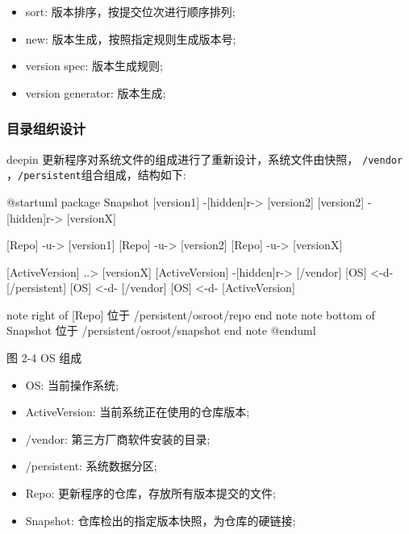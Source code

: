 \documentclass{utart}
\begin{document}
\begin{itemize}[leftmargin=4em]
  \item sort: 版本排序，按提交位次进行顺序排列;
  \item new: 版本生成，按照指定规则生成版本号;
  \item version spec: 版本生成规则;
  \item version generator: 版本生成;
\end{itemize}


\subsubsection{目录组织设计}

deepin 更新程序对系统文件的组成进行了重新设计，系统文件由快照， \texttt{/vendor} ，\texttt{/persistent}组合组成，结构如下:
\begin{center}
  \begin{adjustbox}{scale=0.75}
    \begin{plantuml}
    @startuml
    package Snapshot {
      [version1] -[hidden]r-> [version2]
      [version2] -[hidden]r-> [versionX]
    }

    [Repo] -u-> [version1]
    [Repo] -u-> [version2]
    [Repo] -u-> [versionX]

    [ActiveVersion] ..> [versionX]
    [ActiveVersion] -[hidden]r-> [/vendor]
    [OS] <-d- [/persistent]
    [OS] <-d- [/vendor]
    [OS] <-d- [ActiveVersion]

    note right of [Repo]
    位于 /persistent/osroot/repo
    end note
    note bottom of Snapshot
    位于 /persistent/osroot/snapshot
    end note
    @enduml
    \end{plantuml}
  \end{adjustbox}

  图 2-4 OS 组成
\end{center}

\begin{itemize}[leftmargin=4em]
  \item OS: 当前操作系统;
  \item ActiveVersion: 当前系统正在使用的仓库版本;
  \item /vendor: 第三方厂商软件安装的目录;
  \item /persistent: 系统数据分区;
  \item Repo: 更新程序的仓库，存放所有版本提交的文件;
  \item Snapshot: 仓库检出的指定版本快照，为仓库的硬链接;
\end{itemize}
\end{document}
